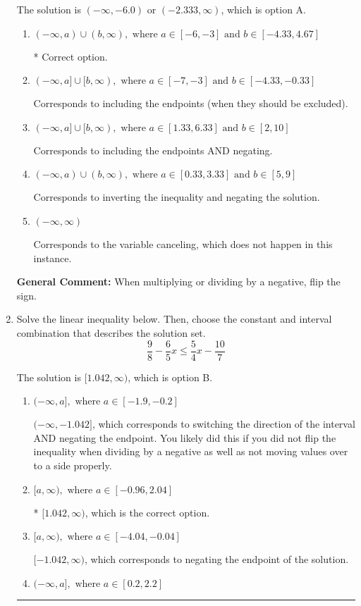 \documentclass{extbook}[14pt]
\newcommand{\litem}[1]{\item #1

\rule{\textwidth}{0.4pt}}
\begin{document}
\begin{enumerate}
{The solution is \( (-\infty, -6.0) \text{ or } (-2.333, \infty) \), which is option A.\begin{enumerate}[label=\Alph*.]
\item \( (-\infty, a) \cup (b, \infty), \text{ where } a \in [-6, -3] \text{ and } b \in [-4.33, 4.67] \)

 * Correct option.
\item \( (-\infty, a] \cup [b, \infty), \text{ where } a \in [-7, -3] \text{ and } b \in [-4.33, -0.33] \)

Corresponds to including the endpoints (when they should be excluded).
\item \( (-\infty, a] \cup [b, \infty), \text{ where } a \in [1.33, 6.33] \text{ and } b \in [2, 10] \)

Corresponds to including the endpoints AND negating.
\item \( (-\infty, a) \cup (b, \infty), \text{ where } a \in [0.33, 3.33] \text{ and } b \in [5, 9] \)

Corresponds to inverting the inequality and negating the solution.
\item \( (-\infty, \infty) \)

Corresponds to the variable canceling, which does not happen in this instance.
\end{enumerate}

\textbf{General Comment:} When multiplying or dividing by a negative, flip the sign.
}
\litem{
Solve the linear inequality below. Then, choose the constant and interval combination that describes the solution set.
\[ \frac{9}{8} - \frac{6}{5} x \leq \frac{5}{4} x - \frac{10}{7} \]

The solution is \( [1.042, \infty) \), which is option B.\begin{enumerate}[label=\Alph*.]
\item \( (-\infty, a], \text{ where } a \in [-1.9, -0.2] \)

 $(-\infty, -1.042]$, which corresponds to switching the direction of the interval AND negating the endpoint. You likely did this if you did not flip the inequality when dividing by a negative as well as not moving values over to a side properly.
\item \( [a, \infty), \text{ where } a \in [-0.96, 2.04] \)

* $[1.042, \infty)$, which is the correct option.
\item \( [a, \infty), \text{ where } a \in [-4.04, -0.04] \)

 $[-1.042, \infty)$, which corresponds to negating the endpoint of the solution.
\item \( (-\infty, a], \text{ where } a \in [0.2, 2.2] \)


\end{enumerate}}
\end{enumerate}
\end{document}
